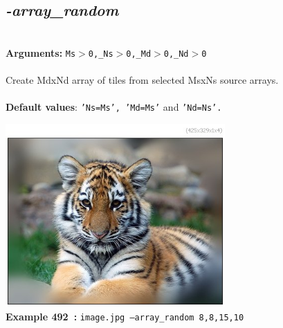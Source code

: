 \documentclass[a4paper,11pt,twoside]{book}
\begin{document}
\subsection{\emph{-array\_random} }\vspace*{-0.5em}
~\\\textbf{Arguments: } 
{\small \texttt{Ms$>$0,\_Ns$>$0,\_Md$>$0,\_Nd$>$0}}\\~\\
Create MdxNd array of tiles from selected MsxNs source arrays.
~\\~\\\textbf{Default values}: {\small \texttt{'Ns=Ms', 'Md=Ms'} and \texttt{'Nd=Ns'.}}
\begin{center}\includegraphics[keepaspectratio=true,height=7cm,width=\textwidth]{img/gmic_def492.jpg}\\
{\footnotesize \textbf{Example 492~:} \texttt{image.jpg --array\_random 8,8,15,10}}
\end{center}
\end{document}
